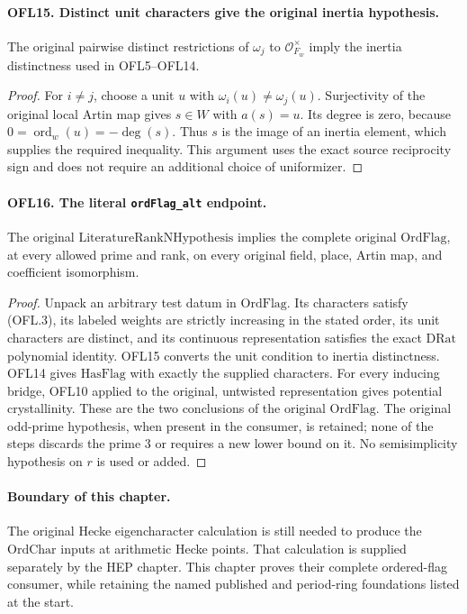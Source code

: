 \paragraph{OFL15. Distinct unit characters give the original inertia hypothesis.}
\label{claim:OFL15}
The original pairwise distinct restrictions of \(\omega_j\) to
\(\mathcal O_{F_w}^\times\) imply the inertia distinctness used
in OFL5--OFL14.
\begin{proof}
For \(i\ne j\), choose a unit \(u\) with
\(\omega_i(u)\ne\omega_j(u)\).  Surjectivity of the
original local Artin map gives \(s\in W\) with \(a(s)=u\).
Its degree is zero, because
\(0=\operatorname{ord}_w(u)=-\deg(s)\).  Thus \(s\)
is the image of an inertia element, which supplies the required
inequality.  This argument uses the exact source reciprocity
sign and does not require an additional choice of uniformizer.
\end{proof}

\paragraph{OFL16. The literal \texttt{ordFlag\_alt} endpoint.}
\label{claim:OFL16}
The original \(\mathrm{LiteratureRankNHypothesis}\) implies
the complete original \(\mathrm{OrdFlag}\), at every allowed
prime and rank, on every original field, place, Artin map, and
coefficient isomorphism.
\begin{proof}
Unpack an arbitrary test datum in \(\mathrm{OrdFlag}\).
Its characters satisfy (OFL.3), its labeled weights are strictly
increasing in the stated order, its unit characters are distinct,
and its continuous representation satisfies the exact
\(\mathrm{DRat}\) polynomial identity.  OFL15 converts the
unit condition to inertia distinctness.  OFL14 gives
\(\mathrm{HasFlag}\) with exactly the supplied characters.
For every inducing bridge, OFL10 applied to the original,
untwisted representation gives potential crystallinity.  These
are the two conclusions of the original \(\mathrm{OrdFlag}\).
The original odd-prime hypothesis, when present in the consumer,
is retained; none of the steps discards the prime \(3\) or
requires a new lower bound on it.  No semisimplicity hypothesis
on \(r\) is used or added.
\end{proof}

\paragraph{Boundary of this chapter.}
The original Hecke eigencharacter calculation is still needed to
produce the \(\mathrm{OrdChar}\) inputs at arithmetic Hecke
points.  That calculation is supplied separately by the HEP
chapter.  This chapter proves their complete ordered-flag consumer,
while retaining the named published and period-ring foundations
listed at the start.
